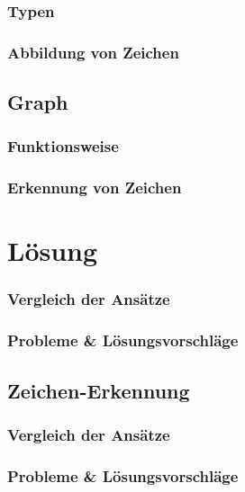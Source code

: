\documentclass[a4paper,twopage,ngerman,11pt]{scrreprt}
\begin{document}
		\section{Typen}
		\section{Abbildung von Zeichen}

		\chapter{Graph}
		\section{Funktionsweise}
		\section{Erkennung von Zeichen}

	\part{Lösung}
		
		\section{Vergleich der Ansätze}
		\section{Probleme \& Lösungsvorschläge}
		
		\chapter{Zeichen-Erkennung}
		\section{Vergleich der Ansätze}
		\section{Probleme \& Lösungsvorschläge}
		
		
\end{document}
